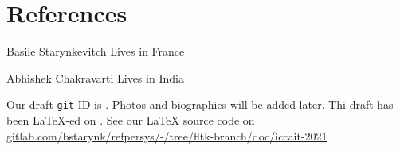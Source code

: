 \documentclass{IEEEtran}
\begin{document}



\section*{References}

%
%

%
%

\medskip

% 

\begin{IEEEbiographynophoto}{Basile Starynkevitch}
Lives in France
\end{IEEEbiographynophoto}

\begin{IEEEbiographynophoto}{Abhishek Chakravarti}
Lives in India
\end{IEEEbiographynophoto}








\begin{flushright}
  \begin{relsize}{-1}
    Our draft \texttt{git} ID is
    \texttt{\textit{\rpsgitcommit}}. Photos and biographies will be
    added later. Thi draft has been \LaTeX-ed on
    \textit{\rpstimestamp}. See our {\LaTeX} source code on
    \href{https://gitlab.com/bstarynk/refpersys/-/tree/fltk-branch/doc/iccait-2021}{gitlab.com/bstarynk/refpersys/-/tree/fltk-branch/doc/iccait-2021}
  \end{relsize}
\end{flushright}

\end{document}
